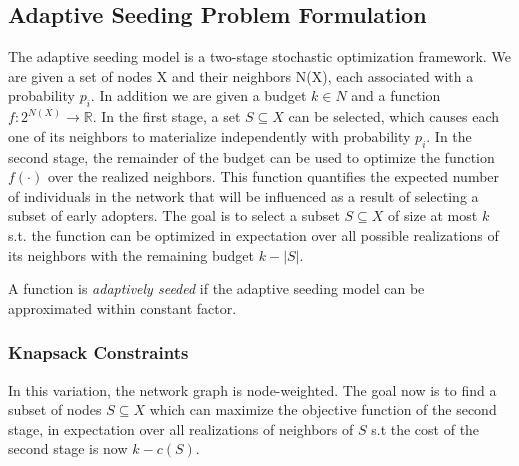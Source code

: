 \subsection{Adaptive Seeding Problem Formulation}\label{sec:model}
The adaptive seeding model is a two-stage stochastic optimization framework. We are given a set of nodes {X} and their neighbors {N(X)}, each associated with a probability $p_i$. In addition we are given a budget $k \in N$ and a function $f:2^{N(X)} \rightarrow \mathbb{R}$.  In the first stage, a set $S \subseteq X$ can be selected, which causes each one of its neighbors to materialize independently with probability $p_i$. In the second stage, the remainder of the budget can be used to optimize the function $f \left( \cdot \right)$ over the realized neighbors. This function quantifies the expected number of individuals in the network that will be influenced as a result of selecting a subset of early adopters. The goal is to select a subset $S \subseteq X$ of size at most $k$ s.t. the function can be optimized in expectation over all possible realizations of its neighbors with the remaining budget $k - |S|$.

A function is \textit{adaptively seeded} if the adaptive seeding model can be approximated within constant factor.



\subsubsection{Knapsack Constraints}
In this variation, the network graph is node-weighted. The goal now is to find a subset of nodes $S \subseteq X$ which can maximize the objective function of the
second stage, in expectation over all realizations of neighbors of $S$ s.t the cost of the second stage is now $k - c(S)$. 


